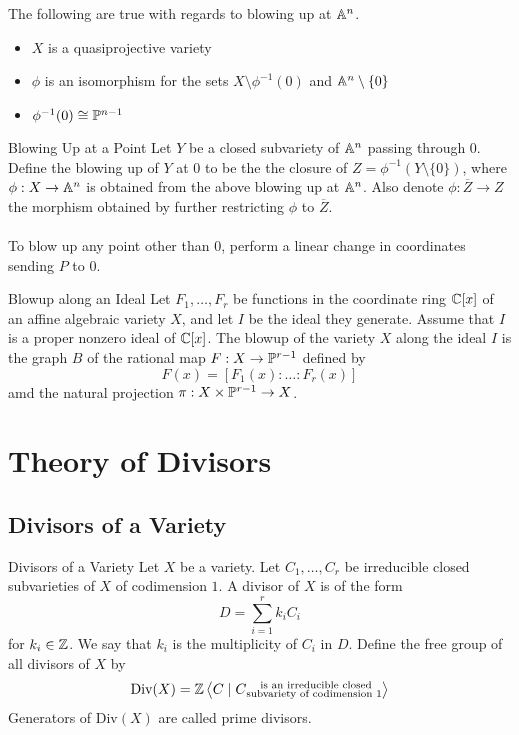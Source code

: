 \documentclass[a4paper]{article}
\begin{document}
\begin{thm}{}{} The following are true with regards to blowing up at $\mathbb{A}^n$. 
\begin{itemize}
\item $X$ is a quasiprojective variety
\item $\phi$ is an isomorphism for the sets $X\setminus\phi^{-1}(0)$ and $\mathbb{A}^n\setminus\{0\}$
\item $\phi^{-1}(0)\cong\mathbb{P}^{n-1}$
\end{itemize}
\end{thm}

\begin{defn}{Blowing Up at a Point}{} Let $Y$ be a closed subvariety of $\mathbb{A}^n$ passing through $0$. Define the blowing up of $Y$ at $0$ to be the the closure of $Z=\phi^{-1}(Y\setminus\{0\})$, where $\phi:X\to\mathbb{A}^n$ is obtained from the above blowing up at $\mathbb{A}^n$. Also denote $\phi:\overline{Z}\to Z$ the morphism obtained by further restricting $\phi$ to $\overline{Z}$. \\~\\
To blow up any point other than $0$, perform a linear change in coordinates sending $P$ to $0$. 
\end{defn}

\begin{defn}{Blowup along an Ideal}{} Let $F_1,\dots,F_r$ be functions in the coordinate ring $\mathbb{C}[x]$ of an affine algebraic variety $X$, and let $I$ be the ideal they generate. Assume that $I$ is a proper nonzero ideal of $\mathbb{C}[x]$. The blowup of the variety $X$ along the ideal $I$ is the graph $B$ of the rational map $F:X\to\mathbb{P}^{r-1}$ defined by $$F(x)=[F_1(x):\dots:F_r(x)]$$ amd the natural projection $\pi:X\times\mathbb{P}^{r-1}\to X$. 
\end{defn}

\pagebreak
\section{Theory of Divisors}
\subsection{Divisors of a Variety}
\begin{defn}{Divisors of a Variety}{} Let $X$ be a variety. Let $C_1,\dots,C_r$ be irreducible closed subvarieties of $X$ of codimension $1$. A divisor of $X$ is of the form $$D=\sum_{i=1}^rk_iC_i$$ for $k_i\in\mathbb{Z}$. We say that $k_i$ is the multiplicity of $C_i$ in $D$. Define the free group of all divisors of $X$ by $$\text{Div}(X)=\mathbb{Z}\left\langle C\;|\;C\substack{\text{ is an irreducible closed}\\\text{subvariety of codimension }1}\right\rangle$$ Generators of $\text{Div}(X)$ are called prime divisors. 
\end{defn}
\end{document}
